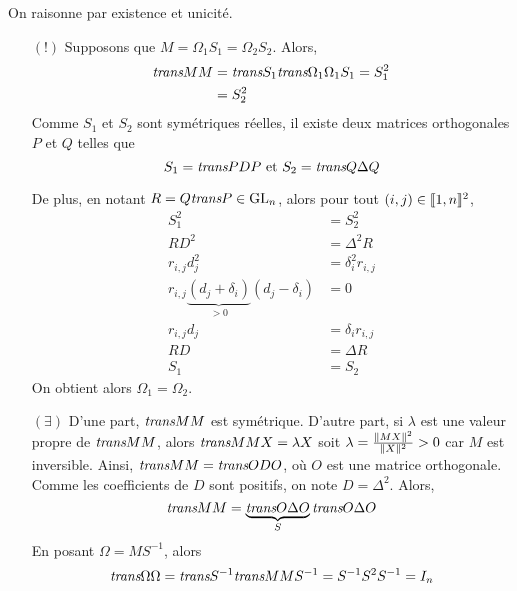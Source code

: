 On raisonne par existence et unicité.
\begin{itemize}
\item[$(!)$] Supposons que $M = \Omega_1 S_1 = \Omega_2 S_2$. Alors,
\begin{align*}
\textit{trans}{M} M &= \textit{trans}{S_1} \textit{trans}{\Omega_1} \Omega_1 S_1 = S_1^2 \\
&= S_2^2
\end{align*}
Comme $S_1$ et $S_2$ sont symétriques réelles, il existe deux matrices orthogonales $P$ et $Q$ telles que
\[
S_1 = \textit{trans}{P} D P \text{ et } S_2 = \textit{trans}{Q} \Delta Q
\]

De plus, en notant $R = Q \textit{trans}{P} \in \mathrm{GL}_n$, alors pour tout $(i, j) \in \llbracket1,n\rrbracket^2$,
\begin{align*}
S_1^2 &= S_2^2 \\
R D^2 &= \Delta^2 R \\
r_{i,j} d_j^2 &= \delta_i^2 r_{i,j} \\
r_{i,j} \underbrace{(d_j + \delta_i)}_{>0} (d_j - \delta_i) &= 0 \\
r_{i,j} d_j &= \delta_i r_{i,j} \\
R D &= \Delta R \\
S_1 &= S_2
\end{align*}
On obtient alors $\Omega_1 = \Omega_2$.

\item[$(\exists)$] D'une part, $\textit{trans}{M} M$ est symétrique. D'autre part, si $\lambda$ est une valeur propre de $\textit{trans}{M} M$, alors $\textit{trans}{M} M X = \lambda X$ soit $\lambda = \frac{\Vert M X \Vert^2}{\Vert X \Vert^2} > 0$ car $M$ est inversible. Ainsi, $\textit{trans}{M} M = \textit{trans}{O} D O$, où $O$ est une matrice orthogonale. Comme les coefficients de $D$ sont positifs, on note $D = \Delta^2$. Alors,
\[
\textit{trans}{M} M = \underbrace{\textit{trans}{O} \Delta O}_{S} \textit{trans}{O} \Delta O
\]
En posant $\Omega = M S^{-1}$, alors
\[
\textit{trans}{\Omega} \Omega = \textit{trans}{S}^{-1} \textit{trans}{M} M S^{-1} = S^{-1} S^2 S^{-1} = I_n
\]
\end{itemize}
